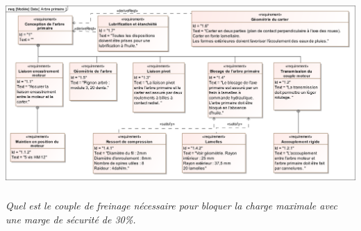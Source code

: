 \documentclass[10pt]{article}
\newif\ifprof
\begin{document}
\begin{center}
\includegraphics[width=\textwidth]{images/SysML/ArbrePrimaire.png}
\end{center}
%
\fi
\subparagraph{}
\textit{Quel est le couple de freinage nécessaire pour bloquer la charge maximale avec une marge de sécurité de 30\%.}

\ifprof
\begin{corrige}
La charge maximale que le treuil doit pouvoir lever est de 7,5 kN. Le diamètre maximal d'enroulement sur l'arbre de sortie est de 500 mm soit 250 mm de rayon. Le couple maximal sur l'arbre de sortie est donc $C_S = 250\cdot 10^{-3}\cdot 7,5\cdot 10^{3} = 1\, 875 \; \text{Nm}.$

On a : $\dfrac{\omega_S}{\omega_E} =\dfrac{1}{k_T}= (-1)^2 \dfrac{20\cdot 15}{80\cdot 70}\simeq 0,0536$ et dans l'hypothèse ou le rendement est unitaire, on a : $C_E = \dfrac{C_S}{k_T} \simeq 100,5\; \text{Nm}$. 

En tenant compte de le marge de sécurité de 30\%, le couple à fournir est de $131\; \text{Nm}$.

\end{corrige}
\else
\fi
\end{document}
